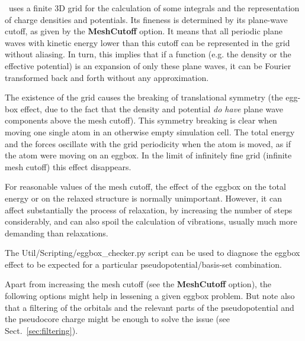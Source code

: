 \siesta\ uses a finite 3D grid for the calculation of some
integrals and the representation of charge densities and potentials.
Its fineness is determined by its plane-wave cutoff, as
given by the \textbf{MeshCutoff} option. It means that all periodic
plane waves with kinetic energy lower than this cutoff 
can be represented in the grid without aliasing. In turn,
this implies that if a function (e.g. the density or the 
effective potential) is an expansion of
only these plane waves, it can be Fourier transformed
back and forth without any approximation.

The existence of the grid causes the breaking of translational
symmetry (the egg-box effect, due to the fact that the density
and potential \textit{do have} plane wave components above
the mesh cutoff).  This symmetry breaking is clear when
moving one single atom in an otherwise empty simulation cell. The
total energy and the forces oscillate with the grid periodicity when
the atom is moved, as if the atom were moving on an eggbox. In the
limit of infinitely fine grid (infinite mesh cutoff) this effect
disappears.

For reasonable values of the mesh cutoff, the effect of the eggbox
on the total energy or on the relaxed structure is normally unimportant.
However, it can affect substantially the process of relaxation, by
increasing the number of steps considerably, and can also spoil the
calculation of vibrations, usually much more demanding than relaxations.

The Util/Scripting/eggbox\_checker.py script can be used to diagnose
the eggbox effect to be expected for a particular
pseudopotential/basis-set combination.

Apart from increasing the mesh cutoff (see the \textbf{MeshCutoff} option),
the following options might help in lessening a given eggbox problem. But
note also that a filtering of the orbitals and the relevant parts of
the pseudopotential and the pseudocore charge might be enough to solve
the issue (see Sect.~\ref{sec:filtering}).

